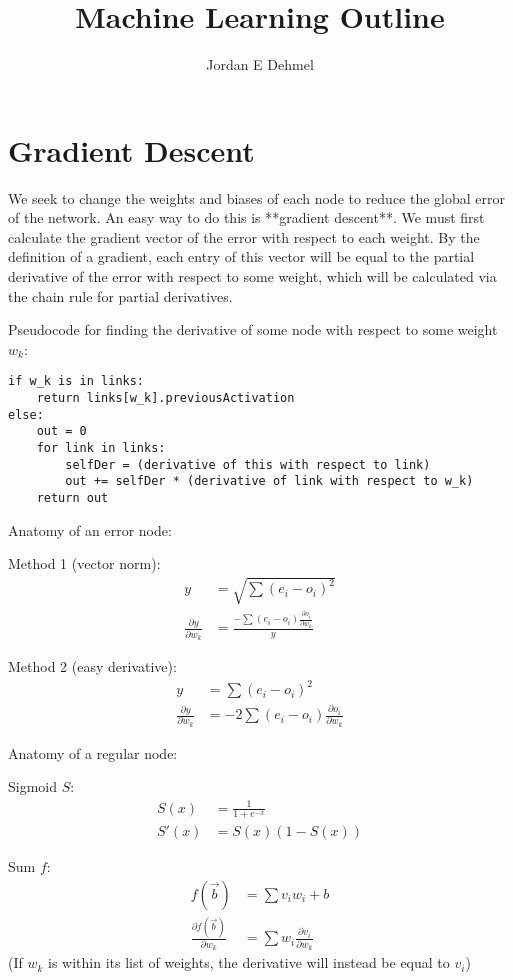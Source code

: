 \documentclass[8pt]{amsart}
\title{Machine Learning Outline}
\author{Jordan E Dehmel}
\date{}
\begin{document}
\maketitle

\section{Gradient Descent}

We seek to change the weights and biases of each node to reduce the
global error of the network. An easy way to do this is **gradient descent**.
We must first calculate the gradient vector of the error with respect to
each weight. By the definition of a gradient, each entry of this vector will
be equal to the partial derivative of the error with respect to some weight,
which will be calculated via the chain rule for partial derivatives.

Pseudocode for finding the derivative of some node with respect to
some weight $w_k$:
\begin{verbatim}
if w_k is in links:
    return links[w_k].previousActivation
else:
    out = 0
    for link in links:
        selfDer = (derivative of this with respect to link)
        out += selfDer * (derivative of link with respect to w_k)
    return out
\end{verbatim}

Anatomy of an error node:

Method 1 (vector norm):
$$
\begin{aligned}
    y &= \sqrt{\sum{(e_i - o_i)^2}} \\
    \frac{\partial y}{\partial w_k} &= \frac{-\sum{(e_i - o_i)\frac{\partial o_i}{\partial w_k}}}{y}
\end{aligned}
$$

Method 2 (easy derivative):
$$
\begin{aligned}
    y &= \sum{(e_i - o_i)^2} \\
    \frac{\partial y}{\partial w_k} &= -2 \sum{(e_i - o_i) \frac{\partial o_i}{\partial w_k}}
\end{aligned}
$$

Anatomy of a regular node:

Sigmoid $S$:
$$
\begin{aligned}
    S(x) &= \frac{1}{1 + e^{-x}} \\
    S'(x) &= S(x) (1 - S(x))
\end{aligned}
$$

Sum $f$:
$$
\begin{aligned}
    f(\vec{b}) &= \sum{v_i w_i} + b \\
    \frac{\partial f(\vec{b})}{\partial w_k} &= \sum{w_i \frac{\partial v_i}{\partial w_k}}
\end{aligned}
$$
(If $w_k$ is within its list of weights, the derivative will instead be equal to $v_i$)
\end{document}
